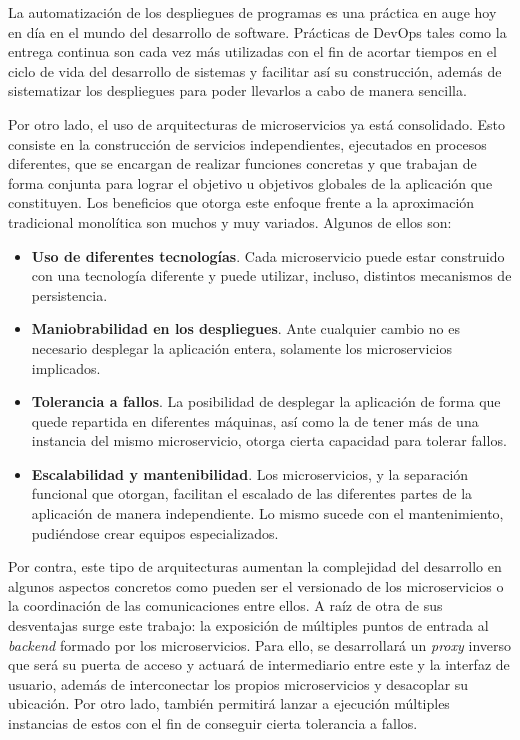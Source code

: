 \documentclass[11pt,spanish,listoffigures]{tfgetsinf}
\begin{document}
La automatización de los despliegues de programas es una práctica en auge hoy en día en el mundo del desarrollo de software. Prácticas de DevOps \cite{DevOps} tales como la entrega continua \cite{DevOpsPracticas} son cada vez más utilizadas con el fin de acortar tiempos en el ciclo de vida del desarrollo de sistemas y facilitar así su construcción, además de sistematizar los despliegues para poder llevarlos a cabo de manera sencilla.

Por otro lado, el uso de arquitecturas de microservicios \cite{Microservicios_articulo} \cite{Microservicios_libro} ya está consolidado. Esto consiste en la construcción de servicios independientes, ejecutados en procesos diferentes, que se encargan de realizar funciones concretas y que trabajan de forma conjunta para lograr el objetivo u objetivos globales de la aplicación que constituyen. Los beneficios que otorga este enfoque frente a la aproximación tradicional monolítica son muchos y muy variados. Algunos de ellos son:

\begin{itemize}

	\item \textbf{Uso de diferentes tecnologías}. Cada microservicio puede estar construido con una tecnología diferente y puede utilizar, incluso, distintos mecanismos de persistencia.

	\item \textbf{Maniobrabilidad en los despliegues}. Ante cualquier cambio no es necesario desplegar la aplicación entera, solamente los microservicios implicados.

	\item \textbf{Tolerancia a fallos}. La posibilidad de desplegar la aplicación de forma que quede repartida en diferentes máquinas, así como la de tener más de una instancia del mismo microservicio, otorga cierta capacidad para tolerar fallos.

	\item \textbf{Escalabilidad y mantenibilidad}. Los microservicios, y la separación funcional que otorgan, facilitan el escalado de las diferentes partes de la aplicación de manera independiente. Lo mismo sucede con el mantenimiento, pudiéndose crear equipos especializados.

\end{itemize}

Por contra, este tipo de arquitecturas aumentan la complejidad del desarrollo en algunos aspectos concretos como pueden ser el versionado de los microservicios o la coordinación de las comunicaciones entre ellos. A raíz de otra de sus desventajas surge este trabajo: la exposición de múltiples puntos de entrada al \emph{backend} formado por los microservicios. Para ello, se desarrollará un \emph{proxy} inverso que será su puerta de acceso y actuará de intermediario entre este y la interfaz de usuario, además de interconectar los propios microservicios y desacoplar su ubicación. Por otro lado, también permitirá lanzar a ejecución múltiples instancias de estos con el fin de conseguir cierta tolerancia a fallos.
\end{document}
